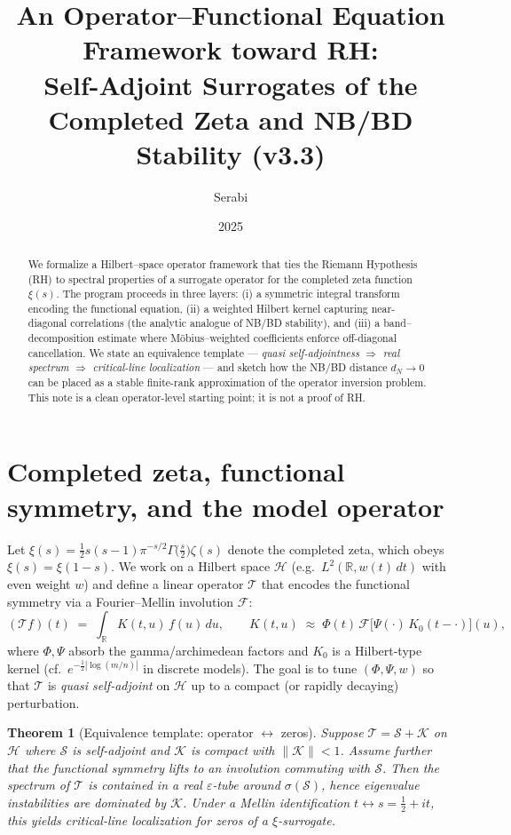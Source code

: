 \documentclass[11pt]{article}
\title{An Operator--Functional Equation Framework toward RH:\\
Self-Adjoint Surrogates of the Completed Zeta and NB/BD Stability (v3.3)}
\author{Serabi}
\date{2025}
\newtheorem{theorem}{Theorem}
\theoremstyle{remark}
\begin{document}
\maketitle

\begin{abstract}
We formalize a Hilbert--space operator framework that ties the Riemann Hypothesis (RH) to spectral properties of a surrogate operator for the completed zeta function $\xi(s)$. 
The program proceeds in three layers: (i) a symmetric integral transform encoding the functional equation, (ii) a weighted Hilbert kernel capturing near-diagonal correlations (the analytic analogue of NB/BD stability), and (iii) a band--decomposition estimate where M\"obius--weighted coefficients enforce off-diagonal cancellation. 
We state an equivalence template --- \emph{quasi self-adjointness $\Rightarrow$ real spectrum $\Rightarrow$ critical-line localization} --- and sketch how the NB/BD distance $d_N\to 0$ can be placed as a stable finite-rank approximation of the operator inversion problem. 
This note is a clean operator-level starting point; it is not a proof of RH.
\end{abstract}

\section{Completed zeta, functional symmetry, and the model operator}
Let $\xi(s)=\tfrac{1}{2}s(s-1)\pi^{-s/2}\Gamma\!\big(\tfrac{s}{2}\big)\zeta(s)$ denote the completed zeta, which obeys $\xi(s)=\xi(1-s)$. 
We work on a Hilbert space $\mathcal{H}$ (e.g.\ $L^2(\mathbb{R},w(t)\,dt)$ with even weight $w$) and define a linear operator $\mathcal{T}$ that encodes the functional symmetry via a Fourier--Mellin involution $\mathcal{F}$:
\[
(\mathcal{T}f)(t) \;=\; \int_{\mathbb{R}} K(t,u)\,f(u)\,du, 
\qquad K(t,u) \;\approx\; \Phi(t)\,\mathcal{F}\big[\Psi(\cdot)\,K_0(t-\cdot)\big](u),
\]
where $\Phi,\Psi$ absorb the gamma/archimedean factors and $K_0$ is a Hilbert-type kernel (cf.\ $e^{-\frac12|\log(m/n)|}$ in discrete models). 
The goal is to tune $(\Phi,\Psi,w)$ so that $\mathcal{T}$ is \emph{quasi self-adjoint} on $\mathcal{H}$ up to a compact (or rapidly decaying) perturbation.

\begin{theorem}[Equivalence template: operator $\leftrightarrow$ zeros]\label{thm:template}
Suppose $\mathcal{T}=\mathcal{S}+\mathcal{K}$ on $\mathcal{H}$ where $\mathcal{S}$ is self-adjoint and $\mathcal{K}$ is compact with $\|\mathcal{K}\|<1$. 
Assume further that the functional symmetry lifts to an involution commuting with $\mathcal{S}$. 
Then the spectrum of $\mathcal{T}$ is contained in a real $\varepsilon$-tube around $\sigma(\mathcal{S})$, hence eigenvalue instabilities are dominated by $\mathcal{K}$. 
Under a Mellin identification $t\leftrightarrow s=\tfrac12+it$, this yields critical-line localization for zeros of a $\xi$-surrogate. 
\end{theorem}
\end{document}
